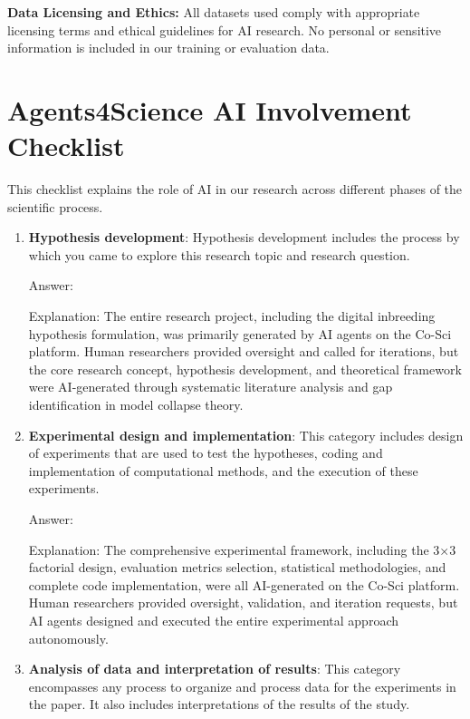 \documentclass{article}
\begin{document}
\textbf{Data Licensing and Ethics:}
All datasets used comply with appropriate licensing terms and ethical guidelines for AI research. No personal or sensitive information is included in our training or evaluation data.

\newpage

\section*{Agents4Science AI Involvement Checklist}

This checklist explains the role of AI in our research across different phases of the scientific process.

\begin{enumerate}
    \item \textbf{Hypothesis development}: Hypothesis development includes the process by which you came to explore this research topic and research question.

    Answer: \involvementC{} %
    
    Explanation: The entire research project, including the digital inbreeding hypothesis formulation, was primarily generated by AI agents on the Co-Sci platform. Human researchers provided oversight and called for iterations, but the core research concept, hypothesis development, and theoretical framework were AI-generated through systematic literature analysis and gap identification in model collapse theory.

    \item \textbf{Experimental design and implementation}: This category includes design of experiments that are used to test the hypotheses, coding and implementation of computational methods, and the execution of these experiments.

    Answer: \involvementC{} %
    
    Explanation: The comprehensive experimental framework, including the 3×3 factorial design, evaluation metrics selection, statistical methodologies, and complete code implementation, were all AI-generated on the Co-Sci platform. Human researchers provided oversight, validation, and iteration requests, but AI agents designed and executed the entire experimental approach autonomously.

    \item \textbf{Analysis of data and interpretation of results}: This category encompasses any process to organize and process data for the experiments in the paper. It also includes interpretations of the results of the study.


\end{enumerate}
\end{document}
